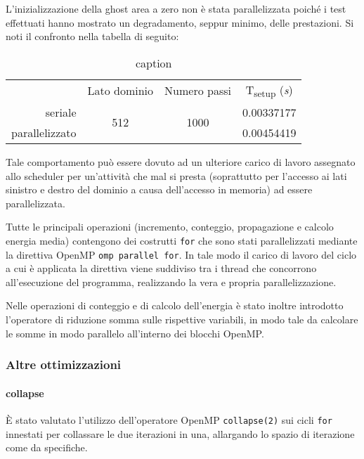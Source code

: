 L'inizializzazione della ghost area a zero non è stata parallelizzata poiché i
test effettuati hanno mostrato un degradamento, seppur minimo, delle
prestazioni. Si noti il confronto nella tabella di seguito:

\begin{table}[ht]
\begin{tabular}{rccc}
\cmidrule[\heavyrulewidth]{2-4}
 & Lato dominio & Numero passi & T\textsubscript{setup} (\textit{s})\\
 \cmidrule[\lightrulewidth]{2-4}
 seriale & \multirow{2}{*}{512} & \multirow{2}{*}{1000} & 0.00337177\\
 parallelizzato &&& 0.00454419\\
\cmidrule[\heavyrulewidth]{2-4}
\end{tabular}
\caption{caption}
\end{table}

Tale comportamento può essere dovuto ad un ulteriore carico di lavoro assegnato
allo scheduler per un'attività che mal si presta (soprattutto per l'accesso ai
lati sinistro e destro del dominio a causa dell'accesso in memoria) ad essere
parallelizzata.

Tutte le principali operazioni (incremento, conteggio, propagazione e calcolo
energia media) contengono dei costrutti \texttt{for} che sono stati
parallelizzati mediante la direttiva OpenMP \texttt{omp parallel for}.
In tale modo il carico di lavoro del ciclo a cui è applicata la direttiva viene
suddiviso tra i thread che concorrono all'esecuzione del programma, realizzando
la vera e propria parallelizzazione.

Nelle operazioni di conteggio e di calcolo dell'energia è stato inoltre
introdotto l'operatore di riduzione somma sulle rispettive variabili, in modo
tale da calcolare le somme in modo parallelo all'interno dei blocchi OpenMP\@.

\subsubsection{Altre ottimizzazioni}

\paragraph{collapse}

È stato valutato l'utilizzo dell'operatore OpenMP \texttt{collapse(2)} sui cicli
\texttt{for} innestati per collassare le due iterazioni in una, allargando lo
spazio di iterazione come da specifiche\cite{openmp2018reference}.

